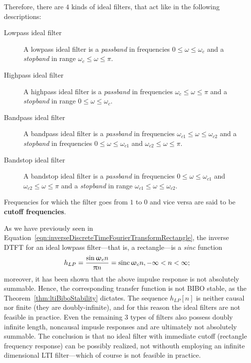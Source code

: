 \documentclass[\documentfontsize, twocolumn]{\classname}
\begin{document}
Therefore, there are $4$ kinds of ideal filters, that act like in the following descriptions:
\begin{description}
    \item[Lowpass ideal filter] A lowpass ideal filter is a \emph{passband} in frequencies $0 \leq \omega \leq \omega_c$ and a \emph{stopband} in range $\omega_c \leq \omega \leq \pi$.
    \item[Highpass ideal filter] A highpass ideal filter is a \emph{passband} in frequencies $\omega_c \leq \omega \leq \pi$ and a \emph{stopband} in range $0 \leq \omega \leq \omega_c$.
    \item[Bandpass ideal filter] A bandpass ideal filter is a \emph{passband} in frequencies $\omega_{c1} \leq \omega \leq \omega_{c2}$ and a \emph{stopband} in frequencies $0 \leq \omega \leq \omega_{c1}$ and $\omega_{c2} \leq \omega \leq \pi$.
    \item[Bandstop ideal filter] A bandstop ideal filter is a \emph{passband} in frequencies $0 \leq \omega \leq \omega_{c1}$ and $\omega_{c2} \leq \omega \leq \pi$ and a \emph{stopband} in range $\omega_{c1} \leq \omega \leq \omega_{c2}$.
\end{description}
Frequencies for which the filter goes from $1$ to $0$ and vice versa are said to be \textbf{cutoff frequencies}.


As we have previously seen in Equation~\ref{eqn:inverseDiscreteTimeFourierTransformRectangle}, the inverse DTFT for an ideal lowpass filter---that is, a rectangle---is a \emph{sinc} function
\[
    h_{LP} = \frac {\sin {\upomega_c n}}{\uppi n} = \operatorname{sinc} {\upomega_c n}, -\infty < n < \infty;
\]
moreover, it has been shown that the above impulse response is not absolutely summable. Hence, the corresponding transfer function is not BIBO stable, as the Theorem~\ref{thm:ltiBiboStability} dictates. The sequence $h_{LP}[n]$ is neither causal nor finite (they are doubly-infinite), and for this reason the ideal filters are not feasible in practice. Even the remaining $3$ types of filters also possess doubly infinite length, noncausal impusle responses and are ultimately not absolutely summable. The conclusion is that no ideal filter with immediate cutoff (rectangle frequency response) can be possibly realized, not withouth employing an infinite dimensional LTI filter---which of course is not feasible in practice.
\end{document}
